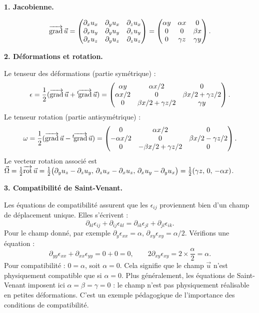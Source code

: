 \documentclass[12pt,a4paper]{article}
\begin{document}
\begin{boitecorrige}

\textbf{1. Jacobienne.}

\[
\overrightarrow{\mathrm{grad}}\,\vec{u} = \begin{pmatrix}
\partial_x u_x & \partial_y u_x & \partial_z u_x \\
\partial_x u_y & \partial_y u_y & \partial_z u_y \\
\partial_x u_z & \partial_y u_z & \partial_z u_z
\end{pmatrix} = \begin{pmatrix}
\alpha y & \alpha x & 0 \\
0 & 0 & \beta x \\
0 & \gamma z & \gamma y
\end{pmatrix}.
\]

\textbf{2. Déformations et rotation.}

Le tenseur des déformations (partie symétrique) :
\[
\epsilon = \frac{1}{2}(\overrightarrow{\mathrm{grad}}\,\vec{u} + {}^t\!\overrightarrow{\mathrm{grad}}\,\vec{u}) = \begin{pmatrix}
\alpha y & \alpha x/2 & 0 \\
\alpha x/2 & 0 & \beta x/2 + \gamma z/2 \\
0 & \beta x/2 + \gamma z/2 & \gamma y
\end{pmatrix}.
\]
Le tenseur rotation (partie antisymétrique) :
\[
\omega = \frac{1}{2}(\overrightarrow{\mathrm{grad}}\,\vec{u} - {}^t\!\overrightarrow{\mathrm{grad}}\,\vec{u}) = \begin{pmatrix}
0 & \alpha x/2 & 0 \\
-\alpha x/2 & 0 & \beta x/2 - \gamma z/2 \\
0 & -\beta x/2 + \gamma z/2 & 0
\end{pmatrix}.
\]
Le vecteur rotation associé est $\vec{\Omega} = \tfrac{1}{2}\overrightarrow{\mathrm{rot}}\,\vec{u} = \tfrac{1}{2}\bigl(\partial_y u_z - \partial_z u_y,\, \partial_z u_x - \partial_x u_z,\, \partial_x u_y - \partial_y u_x\bigr) = \tfrac{1}{2}(\gamma z,\, 0,\, -\alpha x)$.

\textbf{3. Compatibilité de Saint-Venant.}

Les équations de compatibilité assurent que les $\epsilon_{ij}$ proviennent bien d'un champ de déplacement unique. Elles s'écrivent :
\[
\partial_{kl}\epsilon_{ij} + \partial_{ij}\epsilon_{kl} = \partial_{ik}\epsilon_{jl} + \partial_{jl}\epsilon_{ik}.
\]
Pour le champ donné, par exemple $\partial_y\epsilon_{xx} = \alpha$, $\partial_{xy}\epsilon_{xy} = \alpha/2$. Vérifions une équation :
\[
\partial_{yy}\epsilon_{xx} + \partial_{xx}\epsilon_{yy} = 0 + 0 = 0, \qquad 2\partial_{xy}\epsilon_{xy} = 2\times\frac{\alpha}{2} = \alpha.
\]
Pour compatibilité : $0 = \alpha$, soit $\alpha = 0$. Cela signifie que le champ $\vec{u}$ n'est physiquement compatible que si $\alpha = 0$. Plus généralement, les équations de Saint-Venant imposent ici $\alpha = \beta = \gamma = 0$ : le champ n'est pas physiquement réalisable en petites déformations. C'est un exemple pédagogique de l'importance des conditions de compatibilité.

\end{boitecorrige}

\ifdefined\inMainDoc\else
\end{document}
